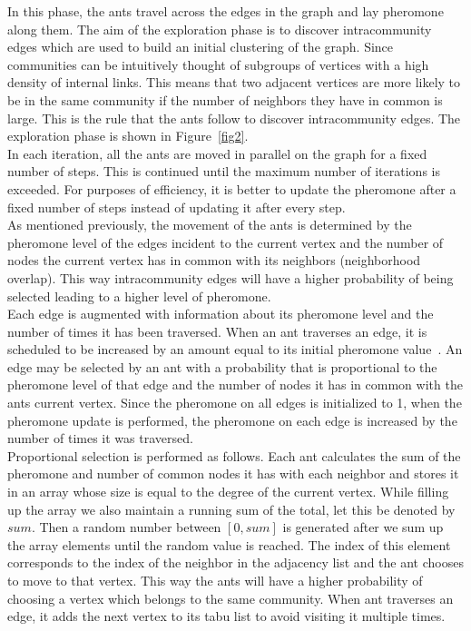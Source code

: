 \begin{spacing}{1.5}
In this phase, the ants travel across the edges in the graph and lay pheromone along them. The aim of the exploration phase is to discover intracommunity edges which are used to build an initial clustering of the graph. Since communities can be intuitively thought of subgroups of vertices with a high density of internal links. This means that two adjacent vertices are more likely to be in the same community if the number of neighbors they have in common is large. This is the rule that the ants follow to discover intracommunity edges. The exploration phase is shown in Figure~\ref{fig2}.\\

\indent In each iteration, all the ants are moved in parallel on the graph for a fixed number of steps. This is continued until the maximum number of iterations is exceeded. For purposes of efficiency, it is better to update the pheromone after a fixed number of steps instead of updating it after every step.\\
\indent As mentioned previously, the movement of the ants is determined by the pheromone level of the edges incident to the current vertex and the number of nodes the current vertex has in common with its neighbors (neighborhood overlap). This way intracommunity edges will have a higher probability of being selected leading to a higher level of pheromone. \\
\indent Each edge is augmented with information about its pheromone level and the number of times it has been traversed. When an ant traverses an edge, it is scheduled to be increased by an amount equal to its initial pheromone value~\cite{5910378}. An edge may be selected by an ant with a probability that is proportional to the pheromone level of that edge and the number of nodes it has in common with the ants current vertex. Since the pheromone on all edges is initialized to 1, when the pheromone update is performed, the pheromone on each edge is increased by the number of times it was traversed.\\
\indent Proportional selection is performed as follows. Each ant calculates the sum of the pheromone and number of common nodes it has with each neighbor and stores it in an array whose size is equal to the degree of the current vertex. While filling up the array we also maintain a running sum of the total, let this be denoted by $sum$. Then a random number between $[0, sum]$ is generated after we sum up the array elements until the random value is reached. The index of this element corresponds to the index of the neighbor in the adjacency list and the ant chooses to move to that vertex. This way the ants will have a higher probability of choosing a vertex which belongs to the same community. When ant traverses an edge, it adds the next vertex to its tabu list to avoid visiting it multiple times.\\

\end{spacing}
